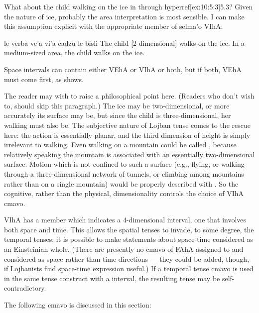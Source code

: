 What about the child walking on the ice in  through hyperref[ex:10:5:3]{5.3}? Given the nature of ice, probably the
    area interpretation is most sensible. I can make this
    assumption explicit with the appropriate member of selma'o
    VIhA:
\begin{example}
le verba ve'a vi'a\n
\T	cadzu le bisli\n
The child  [2-dimensional]\n
\T	walks-on the ice.\n
In a medium-sized area, the child walks on the ice.
\end{example}

Space intervals can contain either VEhA or VIhA or both, but if
    both, VEhA must come first, as 
    shows. 

The reader may wish to raise a philosophical point here.
    (Readers who don't wish to, should skip this paragraph.) The
    ice may be two-dimensional, or more accurately its surface may
    be, but since the child is three-dimensional, her walking must
    also be. The subjective nature of Lojban tense comes to the
    rescue here: the action is essentially planar, and the third
    dimension of height is simply irrelevant to walking. Even
    walking on a mountain could be called , because
    relatively speaking the mountain is associated with an
    essentially two-dimensional surface. Motion which is not
    confined to such a surface (e.g., flying, or walking through a
    three-dimensional network of tunnels, or climbing among
    mountains rather than on a single mountain) would be properly
    described with . So the cognitive, rather than the
    physical, dimensionality controls the choice of VIhA cmavo.

VIhA has a member  which indicates a 4-dimensional
    interval, one that involves both space and time. This allows
    the spatial tenses to invade, to some degree, the temporal
    tenses; it is possible to make statements about space-time
    considered as an Einsteinian whole. (There are presently no
    cmavo of FAhA assigned to  and 
    considered as space rather than time directions --- they could
    be added, though, if Lojbanists find space-time expression
    useful.) If a temporal tense cmavo is used in the same tense
    construct with a  interval, the resulting tense may be
    self-contradictory.



The following cmavo is discussed in this section:

